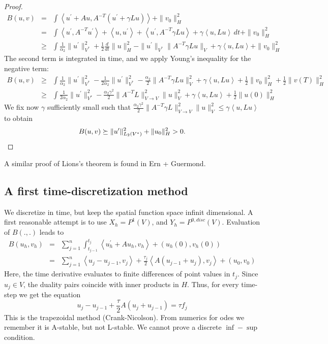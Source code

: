 \begin{proof}
\begin{eqnarray*}
B(u,v) & = & \int \left< u^\prime + A u, A^{-T} (u^\prime + \gamma L u) \right> + \| v_0\|_H^2 \\
& = & \int \left< u^\prime, A^{-T} u^\prime\right> + \left< u, u^ \prime\right> + \left< u^\prime, A^{-T } \gamma L u \right> + \gamma \left< u, L u \right> \, dt +  \| v_0 \|_H^2 \\
& \geq & \int \tfrac{1}{\alpha_2} \| u^\prime \|_{V^\ast}^2 + \tfrac{1}{2} \tfrac{d}{dt} \| u \|_H^2 - \| u^\prime \|_{V^\ast} \| A^{-T} \gamma L u \|_V + \gamma \left< u, L u \right> + \| v_0 \|_{H}^2
\end{eqnarray*}
The second term is integrated in time, and we apply Young's inequality for the negative term:
\begin{eqnarray*}
B(u,v) & \geq & \int \tfrac{1}{\alpha_2} \| u^\prime \|_{V^\ast}^2  - \tfrac{1}{2\alpha_2}\| u^\prime \|_{V^\ast}^2 - \tfrac{\alpha_2}{2} \| A^{-T} \gamma L u \|_V^2 + \gamma \left< u, L u \right> + \tfrac{1}{2} \| v_0 \|_{H}^2 + \tfrac{1}{2}  \| v(T) \|_H^2 \\
& \geq &  \int \tfrac{1}{2 \alpha_2} \| u^\prime \|_{V^\ast}^2  - \tfrac{\alpha_2 \gamma^2}{2} \| A^{-T} L \|_{V \rightarrow V}^2  \| u \|_V^2 + \gamma \left< u, L u \right> + \tfrac{1}{2} \| u(0) \|_{H}^2 
\end{eqnarray*}
We fix now $\gamma$ sufficiently small such that $\tfrac{\alpha_2 \gamma^2}{2} \| A^{-T} \gamma L \|_{V \rightarrow V}^2  \| u \|_V^2 \leq \gamma \left< u, L u \right>$ to obtain
$$
B(u,v) \succeq \| u^\prime \|_{L_2(V^\ast)}^2 + \| u_0 \|_H^2 > 0.
$$
\end{proof}
A similar proof of Lions's theorem is found in Ern + Guermond.
\subsection{A first time-discretization method}
We discretize in time, but keep the spatial function space infinit dimensional. 
A first reasonable attempt is to use $X_h = P^1(V)$, and $Y_h = P^{0,disc}(V)$. 
Evaluation of $B(.,.)$ leads to
\begin{eqnarray*}
B(u_h, v_h) & = & \sum_{j=1}^n \int_{t_{j-1}}^{t_j} \left< u_h^\prime + A u_h , v_h \right> + (u_h(0), v_h(0))  \\
& = & \sum_{j=1}^n \left< u_j - u_{j-1}, v_j \right> + \tfrac{\tau_j}{2} \left<A (u_{j-1} + u_j), v_j \right> + (u_0, v_0)
\end{eqnarray*}
Here, the time derivative evaluates to finite differences of point values in $t_j$. Since $u_j \in V$, the duality pairs
coincide with inner products in $H$. Thus, for every time-step we get the equation
$$
u_j - u_{j-1} + \frac{\tau}{2} A (u_j + u_{j-1}) = \tau f_j
$$
This is the trapezoidal method (Crank-Nicolson). From numerics for odes we remember it is A-stable, but not L-stable.
We cannot prove a discrete $\inf-\sup$ condition.


